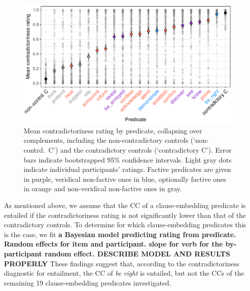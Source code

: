 \documentclass[11pt,fleqn]{article}
\newcommand{\6}{\mbox{$[\hspace*{-.6mm}[$}}
\newcommand{\9}{\mbox{$]\hspace*{-.6mm}]$}}
\begin{document}
{\newpage

\begin{figure}[h!]
\centering

\includegraphics[width=.7\paperwidth]{../results/2-veridicality2/graphs/means-contradictoriness-by-predicate-variability}

\caption{Mean contradictoriness rating by predicate, collapsing over complements, including the non-contradictory controls (`non-contrd.\ C') and the contradictory controls (`contradictory C'). Error bars indicate bootstrapped 95\% confidence intervals. Light gray dots indicate individual participants' ratings. Factive predicates are given in purple, veridical non-factive ones in blue, optionally factive ones in orange and non-veridical non-factive ones in gray.}
\label{f-veridicality-predicate2}
\end{figure}

As mentioned above, we assume that the CC of a clause-embedding predicate is entailed if the contradictoriness rating is not significantly lower than that of the contradictory controls. To determine for which clause-embedding predicates this is the case, we fit {\bf a Bayesian model predicting rating from predicate. Random effects for item and participant. slope for verb for the by-participant random effect. DESCRIBE MODEL AND RESULTS PROPERLY} These findings suggest that, according to the contradictoriness diagnostic for entailment, the CC of {\em be right} is entailed, but not the CCs of the remaining 19 clause-embedding predicates investigated.

}
\end{document}
